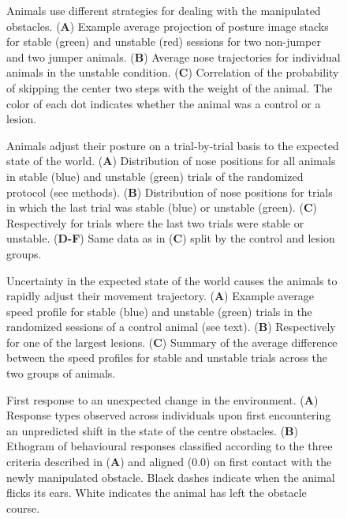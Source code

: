 \begin{figure}
\centering

\caption{Animals use different strategies for dealing with the manipulated obstacles. (\textbf{A}) Example average projection of posture image stacks for stable (green) and unstable (red) sessions for two non-jumper and two jumper animals. (\textbf{B}) Average nose trajectories for individual animals in the unstable condition. (\textbf{C}) Correlation of the probability of skipping the center two steps with the weight of the animal. The color of each dot indicates whether the animal was a control or a lesion.}
\label{fig:jumping}
\end{figure}

\begin{figure}
\centering

\caption{Animals adjust their posture on a trial-by-trial basis to the expected state of the world. (\textbf{A}) Distribution of nose positions for all animals in stable (blue) and unstable (green) trials of the randomized protocol (see methods). (\textbf{B}) Distribution of nose positions for trials in which the last trial was stable (blue) or unstable (green). (\textbf{C}) Respectively for trials where the last two trials were stable or unstable. (\textbf{D-F}) Same data as in (\textbf{C}) split by the control and lesion groups.}
\label{fig:random}
\end{figure}

\begin{figure}
\centering

\caption{Uncertainty in the expected state of the world causes the animals to rapidly adjust their movement trajectory. (\textbf{A}) Example average speed profile for stable (blue) and unstable (green) trials in the randomized sessions of a control animal (see text). (\textbf{B}) Respectively for one of the largest lesions. (\textbf{C}) Summary of the average difference between the speed profiles for stable and unstable trials across the two groups of animals.}
\label{fig:speed}
\end{figure}

\begin{figure}
\centering

\caption{First response to an unexpected change in the environment. (\textbf{A}) Response types observed across individuals upon first encountering an unpredicted shift in the state of the centre obstacles. (\textbf{B}) Ethogram of behavioural responses classified according to the three criteria described in (\textbf{A}) and aligned (0.0) on first contact with the newly manipulated obstacle. Black dashes indicate when the animal flicks its ears. White indicates the animal has left the obstacle course.}
\label{fig:ethogram}
\end{figure}
